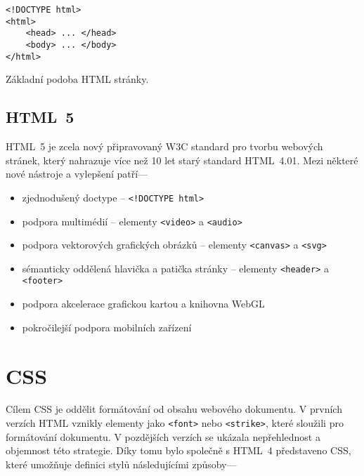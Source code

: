
\begin{example}
    \centering
    \begin{lstlisting}
<!DOCTYPE html>
<html>
    <head> ... </head>
    <body> ... </body>
</html>
    \end{lstlisting}
    \caption{Základní podoba HTML stránky.}
    \label{example:html}
\end{example}

\subsection{HTML~5}

HTML~5 je zcela nový připravovaný W3C standard pro tvorbu webových stránek, který nahrazuje více než 10 let starý standard HTML~4.01. Mezi některé nové nástroje a vylepšení patří---

\begin{itemize}
    \item zjednodušený doctype -- \texttt{<!DOCTYPE html>}
    \item podpora multimédií -- elementy \texttt{<video>} a \texttt{<audio>}
    \item podpora vektorových grafických obrázků -- elementy \texttt{<canvas>} a \texttt{<svg>}
    \item sémanticky oddělená hlavička a patička stránky -- elementy \texttt{<header>} a \texttt{<footer>}
    \item podpora akcelerace grafickou kartou a knihovna WebGL\footnotemark[1]
    \item pokročilejší podpora mobilních zařízení
\end{itemize}


\section{CSS}
\label{sec:css}

Cílem CSS je oddělit formátování od obsahu webového dokumentu. V prvních verzích HTML vznikly elementy jako \texttt{<font>} nebo \texttt{<strike>}, které sloužili pro formátování dokumentu. V pozdějších verzích se ukázala nepřehlednost a objemnost této strategie. Díky tomu bylo společně s HTML~4 představeno CSS, které umožňuje definici stylů následujícími způsoby---


